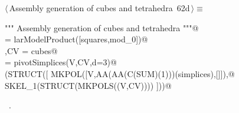\documentclass[11pt,oneside]{article}    %
\begin{document}
\begin{flushleft} \small \label{scrap121}
\protect{}$\langle\,$Assembly generation of cubes and tetrahedra\nobreak\ {\footnotesize 62d}$\,\rangle\equiv$
\vspace{-1ex}
\begin{list}{}{} \item
\mbox{}\verb@""" Assembly generation  of cubes and tetrahedra """@\\
\mbox{}\verb@cubes = larModelProduct([squares,mod_0])@\\
\mbox{}\verb@V,CV = cubes@\\
\mbox{}\verb@simplices = pivotSimplices(V,CV,d=3)@\\
\mbox{}\verb@VIEW(STRUCT([ MKPOL([V,AA(AA(C(SUM)(1)))(simplices),[]]),@\\
\mbox{}\verb@              SKEL_1(STRUCT(MKPOLS((V,CV)))) ]))@\\
\mbox{}\verb@@{\NWsep}
\end{list}
\vspace{-1ex}
\footnotesize\addtolength{\baselineskip}{-1ex}
\begin{list}{}{\setlength{\itemsep}{-\parsep}\setlength{\itemindent}{-\leftmargin}}
\item \NWtxtMacroRefIn\ .
\end{list}
\end{flushleft}









\end{document}
